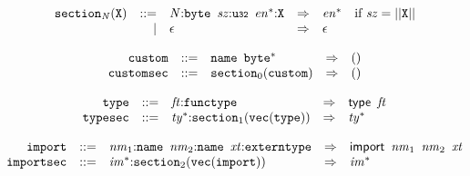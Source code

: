 \vspace{1ex}

\vspace{1ex}

$$
\begin{array}{@{}l@{}rrlll@{}l@{}}
& {{\mathtt{section}}}_{{\mathit{N}}}({\mathtt{X}}) &::=& {\mathit{N}}{:}{\mathtt{byte}}~\,{\mathit{sz}}{:}{\mathtt{u{\scriptstyle32}}}~\,{{\mathit{en}}^\ast}{:}{\mathtt{X}} &\Rightarrow& {{\mathit{en}}^\ast} &\quad
  \mbox{if}~{\mathit{sz}} = ||{\mathtt{X}}|| \\ &&|&
\epsilon &\Rightarrow& \epsilon \\
\end{array}
$$

\vspace{1ex}

$$
\begin{array}{@{}l@{}rrlll@{}l@{}}
& {\mathtt{custom}} &::=& {\mathtt{name}}~\,{{\mathtt{byte}}^\ast} &\Rightarrow& () \\
& {\mathtt{customsec}} &::=& {{\mathtt{section}}}_{0}({\mathtt{custom}}) &\Rightarrow& () \\
\end{array}
$$

\vspace{1ex}

$$
\begin{array}{@{}l@{}rrlll@{}l@{}}
& {\mathtt{type}} &::=& {\mathit{ft}}{:}{\mathtt{functype}} &\Rightarrow& \mathsf{type}~\,{\mathit{ft}} \\
& {\mathtt{typesec}} &::=& {{\mathit{ty}}^\ast}{:}{{\mathtt{section}}}_{1}({\mathtt{vec}}({\mathtt{type}})) &\Rightarrow& {{\mathit{ty}}^\ast} \\
\end{array}
$$

\vspace{1ex}

$$
\begin{array}{@{}l@{}rrlll@{}l@{}}
& {\mathtt{import}} &::=& {\mathit{nm}}_{{1}}{:}{\mathtt{name}}~\,{\mathit{nm}}_{{2}}{:}{\mathtt{name}}~\,{\mathit{xt}}{:}{\mathtt{externtype}} &\Rightarrow& \mathsf{import}~\,{\mathit{nm}}_{{1}}~\,{\mathit{nm}}_{{2}}~\,{\mathit{xt}} \\
& {\mathtt{importsec}} &::=& {{\mathit{im}}^\ast}{:}{{\mathtt{section}}}_{2}({\mathtt{vec}}({\mathtt{import}})) &\Rightarrow& {{\mathit{im}}^\ast} \\
\end{array}
$$

